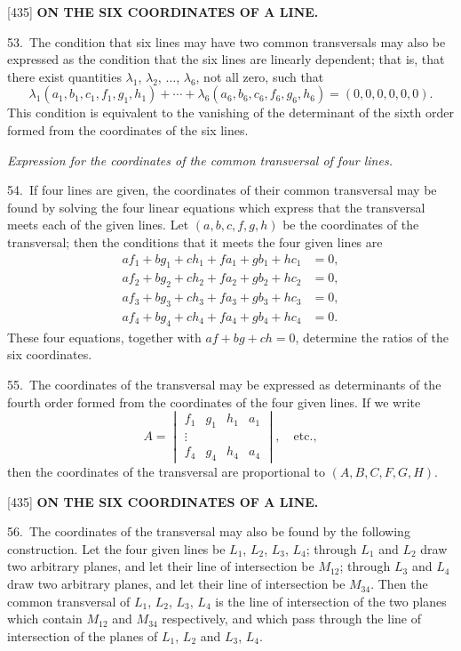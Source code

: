 \documentclass[12pt,a4paper]{article}
\newcommand{\paperref}[1]{\textup{[#1]}}
\theoremstyle{definition}
\begin{document}
\newpage
\setcounter{page}{86}

\noindent\paperref{435}\quad
\textbf{ON THE SIX COORDINATES OF A LINE.}

53.~The condition that six lines may have two common transversals may also be expressed as the condition that the six lines are linearly dependent; that is, that there exist quantities $\lambda_1$, $\lambda_2$, $\ldots$, $\lambda_6$, not all zero, such that
\[
\lambda_1 (a_1, b_1, c_1, f_1, g_1, h_1) + \cdots + \lambda_6 (a_6, b_6, c_6, f_6, g_6, h_6) = (0, 0, 0, 0, 0, 0).
\]
This condition is equivalent to the vanishing of the determinant of the sixth order formed from the coordinates of the six lines.

\textit{Expression for the coordinates of the common transversal of four lines.}

54.~If four lines are given, the coordinates of their common transversal may be found by solving the four linear equations which express that the transversal meets each of the given lines. Let $(a, b, c, f, g, h)$ be the coordinates of the transversal; then the conditions that it meets the four given lines are
\begin{align*}
a f_1 + b g_1 + c h_1 + f a_1 + g b_1 + h c_1 &= 0,\\
a f_2 + b g_2 + c h_2 + f a_2 + g b_2 + h c_2 &= 0,\\
a f_3 + b g_3 + c h_3 + f a_3 + g b_3 + h c_3 &= 0,\\
a f_4 + b g_4 + c h_4 + f a_4 + g b_4 + h c_4 &= 0.
\end{align*}
These four equations, together with $af + bg + ch = 0$, determine the ratios of the six coordinates.

55.~The coordinates of the transversal may be expressed as determinants of the fourth order formed from the coordinates of the four given lines. If we write
\[
A = \begin{vmatrix} f_1 & g_1 & h_1 & a_1 \\ \vdots & & & \\ f_4 & g_4 & h_4 & a_4 \end{vmatrix},
\quad \text{etc.},
\]
then the coordinates of the transversal are proportional to $(A, B, C, F, G, H)$.

\newpage
\setcounter{page}{87}

\noindent\paperref{435}\quad
\textbf{ON THE SIX COORDINATES OF A LINE.}

56.~The coordinates of the transversal may also be found by the following construction. Let the four given lines be $L_1$, $L_2$, $L_3$, $L_4$; through $L_1$ and $L_2$ draw two arbitrary planes, and let their line of intersection be $M_{12}$; through $L_3$ and $L_4$ draw two arbitrary planes, and let their line of intersection be $M_{34}$. Then the common transversal of $L_1$, $L_2$, $L_3$, $L_4$ is the line of intersection of the two planes which contain $M_{12}$ and $M_{34}$ respectively, and which pass through the line of intersection of the planes of $L_1$, $L_2$ and $L_3$, $L_4$.
\end{document}
